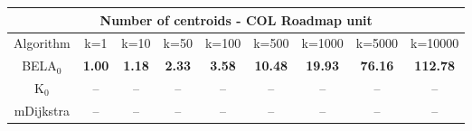 \begin{tabular}{c|cccccccc}\toprule
\multicolumn{9}{c}{Number of centroids - COL Roadmap unit}\\ \midrule
Algorithm & k=1 & k=10 & k=50 & k=100 & k=500 & k=1000 & k=5000 & k=10000 \\ \midrule
BELA$_0$ & \textbf{1.00} & \textbf{1.18} & \textbf{2.33} & \textbf{3.58} & \textbf{10.48} & \textbf{19.93} & \textbf{76.16} & \textbf{112.78} \\
K$_0$ & -- & -- & -- & -- & -- & -- & -- & -- \\
mDijkstra & -- & -- & -- & -- & -- & -- & -- & -- \\ \bottomrule 
\end{tabular}
